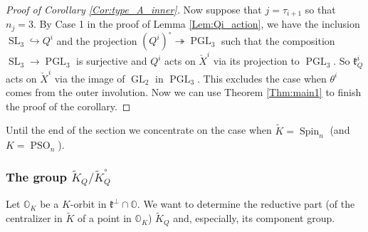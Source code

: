 \documentclass[12pt]{amsart}
\newcommand{\A}{\mathcal{A}}
\newcommand{\Orb}{\mathbb{O}}
\newcommand{\kf}{\mathfrak{k}}
\theoremstyle{definition}
\numberwithin{equation}{section}
\begin{document}
\begin{proof}[Proof of Corollary \ref{Cor:type_A_inner}]
Now suppose that $j=\tau_{i+1}$ so that $n_j=3$. By Case 1 in the proof of Lemma 
\ref{Lem:Qi_action}, we have the inclusion $\operatorname{SL}_3\hookrightarrow Q^i$
and the projection $(Q^i)^\circ\twoheadrightarrow \operatorname{PGL}_3$ such that the composition
$\operatorname{SL}_3\rightarrow \operatorname{PGL}_3$ is surjective and $Q^i$
acts on $\check{X}^i$ via its projection to $\operatorname{PGL}_3$. So $\mathfrak{k}^i_Q$
acts on $\check{X}^i$ via the image of $\operatorname{GL}_2$ in $\operatorname{PGL}_3$.
This excludes the case when $\theta^i$ comes from the outer involution.
Now we can use Theorem \ref{Thm:main1} to finish the proof of the corollary.
%
\end{proof}

Until the end of the section we concentrate on the case when $\tilde{K}=\operatorname{Spin}_n$ (and $K=\operatorname{PSO}_n$).

\subsubsection{The group $\tilde{K}_Q/\tilde{K}_Q^\circ$}
Let $\Orb_K$ be a $K$-orbit in $\kf^\perp\cap \Orb$.
We want to determine the reductive part (of the centralizer in $\tilde{K}$ of a point in $\Orb_K$) $\tilde{K}_Q$ and, especially, its component group.
\end{document}
